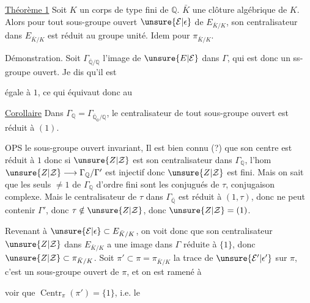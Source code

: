 \uline{Théorème 1} Soit $K$ un corps  de type fini de $\mathbb Q$.  $\bar K$ une clôture algébrique de $K$. Alors pour tout sous-groupe ouvert $\unsure{\mathcal E|\epsilon}$ de $E_{\bar K/K}$, son centralisateur dans $E_{\bar K/K}$ est réduit au groupe unité. Idem pour $\pi_{\bar K/K}$.

Démonstration. Soit $\Gamma_{\overline{\mathbb Q}/\mathbb Q}$ l'image de $\unsure{E|\mathcal E}$ dans $\Gamma$, qui est donc un ss-groupe ouvert.   Je dis qu'il est

égale à $1$, ce qui équivaut donc au

\uline{Corollaire} Dans $\Gamma_{\mathbb Q}=\Gamma_{\overline{\mathbb Q}_0/\mathbb Q}$, le centralisateur de tout sous-groupe ouvert est réduit à $(1)$.

OPS le sous-groupe ouvert  invariant, Il est bien connu (?) que son centre est réduit à $1$
donc si $\unsure{Z|\mathcal Z}$ est son centralisateur dans $\Gamma_{\mathbb Q}$, l'hom $\unsure{Z|\mathcal Z}\longrightarrow\Gamma_{\mathbb Q}/\Gamma'$ est injectif donc $\unsure{Z|\mathcal Z}$ est fini. Mais on sait que les seuls  $\neq1$ de $\Gamma_{\mathbb Q}$ d'ordre fini sont les conjugués de $\tau$, conjugaison complexe. Mais le centralisateur de $\tau$ dans $\Gamma_{\overline{\mathbb Q}}$ est réduit à $(1,\tau)$, donc ne peut contenir $\Gamma'$, donc $\tau\notin\unsure{Z|\mathcal Z}$, donc $\unsure{Z|\mathcal Z}=(1)$.

Revenant à $\unsure{\mathcal E|\epsilon}\subset E_{\bar K/K}$, on voit donc que son centralisateur $\unsure{Z|\mathcal Z}$ dans $E_{\bar K/K}$ a une image dans $\Gamma$ réduite à $\{1\}$, donc $\unsure{Z|\mathcal Z}\subset\pi_{\bar K/K}$. Soit $\pi'\subset\pi=\pi_{\bar K/K}$ la trace de $\unsure{\mathcal E'|\epsilon'}$ sur $\pi$, c'est un sous-groupe ouvert de $\pi$, et on est ramené à

voir que $\operatorname{Centr}_{\pi}(\pi')=\{1\}$, i.e. le

